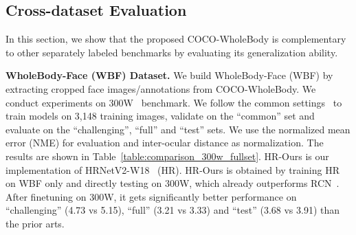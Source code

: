 \documentclass[runningheads]{llncs}
\begin{document}
	\subsection{Cross-dataset Evaluation}
	In this section, we show that the proposed COCO-WholeBody is complementary to other separately labeled benchmarks by evaluating its generalization ability.
	
	\textbf{WholeBody-Face (WBF) Dataset.}
	We build WholeBody-Face (WBF) by extracting cropped face images/annotations from COCO-WholeBody. We conduct experiments on 300W~\cite{sagonas2013300} benchmark. We follow the common settings~\cite{sun2019high} to train models on 3,148 training images, validate on the ``common'' set and evaluate on the ``challenging'', ``full'' and ``test'' sets. We use the normalized mean error (NME) for evaluation and inter-ocular distance as normalization. The results are shown in Table~\ref{table:comparison_300w_fullset}. HR-Ours is our implementation of HRNetV2-W18~\cite{sun2019high} (HR). HR-Ours is obtained by training HR on WBF only and directly testing on 300W, which already outperforms RCN~\cite{honari2016recombinator}. After finetuning on 300W, it gets significantly better performance on ``challenging'' (4.73 vs 5.15), ``full'' (3.21 vs 3.33) and ``test'' (3.68 vs 3.91) than the prior arts.
	
\end{document}

